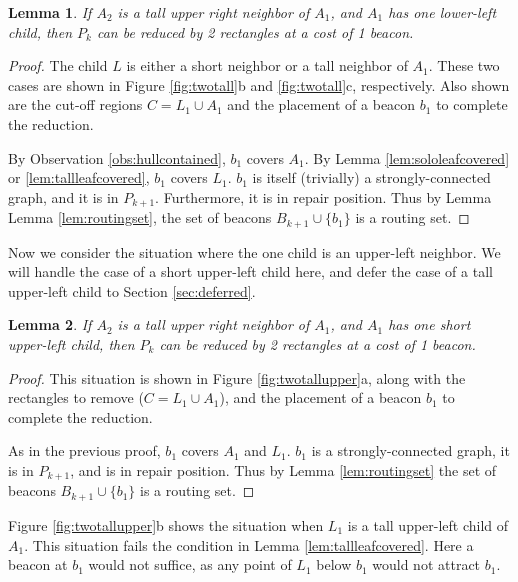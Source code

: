 \documentclass{article}
\newtheorem{lemma}{Lemma}
\begin{document}
		\begin{lemma}\label{lem:lowerleft}
			If $A_2$ is a tall upper right neighbor of $A_1$, and $A_1$ has one
			lower-left child, then $P_k$ can be reduced by 2 rectangles at a cost of 1 beacon.
		\end{lemma}
		\begin{proof}
			The child $L$ is either a short neighbor or a tall neighbor of $A_1$.
			These two cases are shown in  Figure \ref{fig:twotall}b and
			\ref{fig:twotall}c, respectively.  Also shown are the cut-off regions $C = L_1 \cup A_1$ and the
			placement of a beacon $b_1$ to complete the reduction.
			
			By Observation \ref{obs:hullcontained}, $b_1$ covers $A_1$.
			By Lemma \ref{lem:sololeafcovered} or  
			\ref{lem:tallleafcovered}, $b_1$ covers $L_1$.
			$b_1$ is itself (trivially) a strongly-connected graph,
			and it is in $P_{k+1}$.  Furthermore, it is in repair position. 
			Thus by Lemma  Lemma \ref{lem:routingset}, the set of beacons $B_{k+1} \cup
			\{ b_1 \}$ is a routing set.
		\end{proof}

		Now we consider the situation where the one child is an upper-left neighbor.
		We will handle the case of a short upper-left child here, and defer
		the case of a tall upper-left child to Section \ref{sec:deferred}.

		\begin{lemma}\label{lem:upperleft}
			If $A_2$ is a tall upper right neighbor of $A_1$,
			and $A_1$ has one short upper-left child,
			then $P_k$ can be reduced by 2 rectangles at a cost of 1 beacon.
		\end{lemma}
		\begin{proof}
			This situation is shown in  Figure \ref{fig:twotallupper}a,
			along with the rectangles to remove ($C = L_1 \cup A_1$), and the 
			placement of a beacon $b_1$ to complete the reduction.
			
			As in the previous proof, $b_1$ covers $A_1$ and $L_1$.
			$b_1$ is a strongly-connected graph,
			it is in $P_{k+1}$, and is in repair position.
			Thus by Lemma \ref{lem:routingset} the set of beacons $B_{k+1} \cup \{ b_1
			\}$ is a routing set.
		\end{proof}


		Figure \ref{fig:twotallupper}b shows the situation when $L_1$ is a tall
		upper-left child of $A_1$.  This
		situation fails the condition in Lemma \ref{lem:tallleafcovered}.
		Here a beacon at $b_1$ would not suffice, as
		any point of $L_1$ below $b_1$ would not attract $b_1$.  
\end{document}

